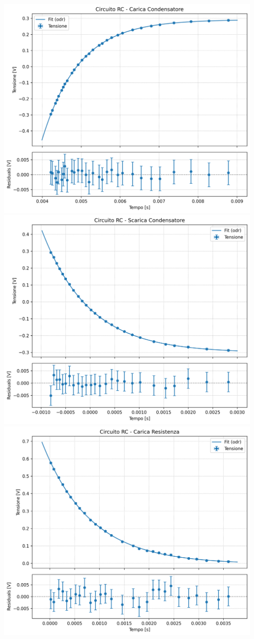 \documentclass[a4paper]{article}
\begin{document}
\begin{center}
    \includegraphics[width=0.9\linewidth]{grafici/rc_carica_condensatore.png}
    \label{fig: rc carica condensatore}
    \includegraphics[width=0.9\linewidth]{grafici/rc_scarica_condensatore.png}
    \label{fig: rc scarica condensatore}
    \includegraphics[width=0.9\linewidth]{grafici/rc_carica_resistenza.png}

\end{center}
\end{document}
